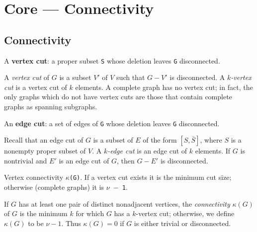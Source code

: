 \section{Core --- Connectivity}
\subsection{Connectivity}


\begin{definition}
\label{SimpleGraph.IsVertexCut}
\leanok
A \textbf{vertex cut}: a proper subset \texttt{S} whose deletion leaves \texttt{G}
disconnected.

A \emph{vertex cut} of $G$ is a subset $V'$ of $V$ such that $G - V'$ is disconnected. A
\emph{$k$-vertex cut} is a vertex cut of $k$ elements. A complete graph has no vertex
cut; in fact, the only graphs which do not have vertex cuts are those that contain
complete graphs as spanning subgraphs.
\end{definition}

\begin{definition}
\label{SimpleGraph.IsEdgeCut}
\leanok
An \textbf{edge cut}: a set of edges of \texttt{G} whose deletion leaves \texttt{G}
disconnected.

Recall that an edge cut of $G$ is a subset of $E$ of the form $[S, \bar{S}]$, where $S$
is a nonempty proper subset of $V$. A \emph{$k$-edge cut} is an edge cut of $k$
elements. If $G$ is nontrivial and $E'$ is an edge cut of $G$, then $G - E'$ is
disconnected.
\end{definition}

\begin{definition}
\label{SimpleGraph.vertexConnectivity}
\leanok
{}
Vertex connectivity \texttt{$\kappa$(G)}. If a vertex cut exists it is the minimum cut
size; otherwise (complete graphs) it is \texttt{$\nu$ $-$ 1}.

If $G$ has at least one pair of distinct nonadjacent vertices, the \emph{connectivity}
$\kappa(G)$ of $G$ is the minimum $k$ for which $G$ has a $k$-vertex cut; otherwise, we
define $\kappa(G)$ to be $\nu - 1$. Thus $\kappa(G) = 0$ if $G$ is either trivial or
disconnected.
\end{definition}

